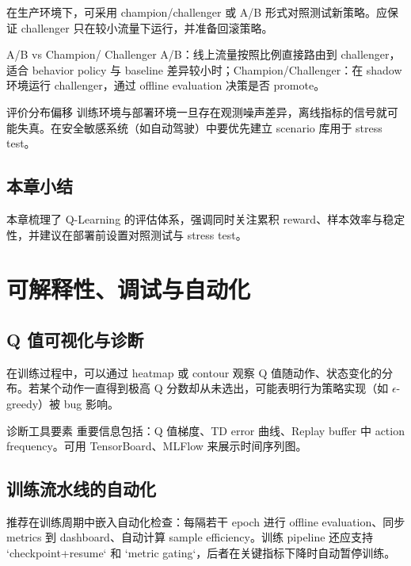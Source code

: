 \documentclass[a4paper]{article}
\begin{document}
在生产环境下，可采用 champion/challenger 或 A/B 形式对照测试新策略。应保证 challenger 只在较小流量下运行，并准备回滚策略。

\begin{knowledgebox}{A/B vs Champion/ Challenger}
A/B：线上流量按照比例直接路由到 challenger，适合 behavior policy 与 baseline 差异较小时；Champion/Challenger：在 shadow 环境运行 challenger，通过 offline evaluation 决策是否 promote。
\end{knowledgebox}

\begin{warningbox}{评价分布偏移}
训练环境与部署环境一旦存在观测噪声差异，离线指标的信号就可能失真。在安全敏感系统（如自动驾驶）中要优先建立 scenario 库用于 stress test。
\end{warningbox}

\subsection{本章小结}

本章梳理了 Q-Learning 的评估体系，强调同时关注累积 reward、样本效率与稳定性，并建议在部署前设置对照测试与 stress test。

\section{可解释性、调试与自动化}

\subsection{Q 值可视化与诊断}

在训练过程中，可以通过 heatmap 或 contour 观察 Q 值随动作、状态变化的分布。若某个动作一直得到极高 Q 分数却从未选出，可能表明行为策略实现（如 $\epsilon$-greedy）被 bug 影响。

\begin{knowledgebox}{诊断工具要素}
重要信息包括：Q 值梯度、TD error 曲线、Replay buffer 中 action frequency。可用 TensorBoard、MLFlow 来展示时间序列图。
\end{knowledgebox}

\subsection{训练流水线的自动化}

推荐在训练周期中嵌入自动化检查：每隔若干 epoch 进行 offline evaluation、同步 metrics 到 dashboard、自动计算 sample efficiency。训练 pipeline 还应支持 `checkpoint+resume` 和 `metric gating`，后者在关键指标下降时自动暂停训练。
\end{document}
